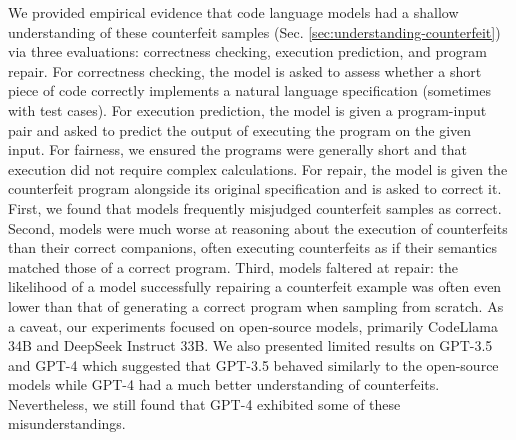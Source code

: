 We provided empirical evidence that code language models had a shallow understanding of these counterfeit
samples (Sec. \ref{sec:understanding-counterfeit}) via three evaluations: correctness checking,
execution prediction, and program repair. For correctness checking, the model is asked to assess
whether a short piece of code correctly implements a natural language specification
(sometimes with test cases). For execution prediction, the model is given a program-input pair
and asked to predict the output of executing the program on the given input. For fairness, we
ensured the programs were generally short and that execution did not require complex calculations.
For repair, the model is given the counterfeit program alongside its original specification and
is asked to correct it. First, we found that models frequently misjudged counterfeit samples as correct.
Second, models were much worse at reasoning about the execution of counterfeits than their correct
companions, often executing counterfeits as if their semantics matched those of a correct program.
Third, models faltered at repair: the likelihood of a model successfully repairing a counterfeit example
was often even lower than that of generating a correct program when sampling from scratch.
As a caveat, our experiments focused on open-source models, primarily CodeLlama 34B and DeepSeek
Instruct 33B. We also presented limited results on GPT-3.5 and GPT-4 which suggested that GPT-3.5
behaved similarly to the open-source models while GPT-4 had a much better understanding of
counterfeits. Nevertheless, we still found that GPT-4 exhibited some of these misunderstandings.

